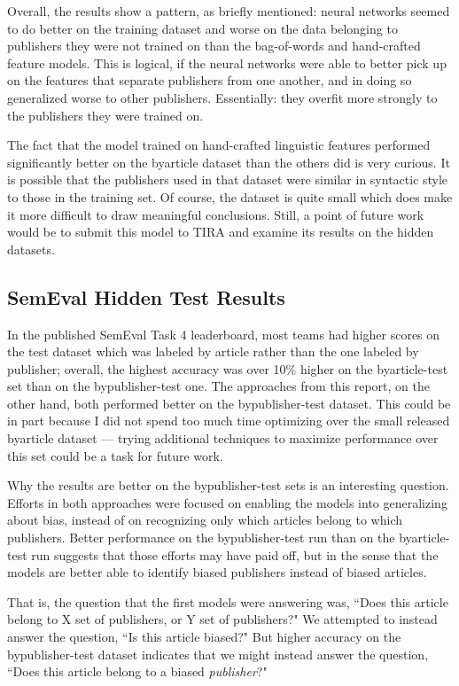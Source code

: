\documentclass[11pt, a4paper]{article}
\begin{document}
Overall, the results show a pattern, as briefly mentioned: neural networks seemed to do better on the training dataset and worse on the data belonging to publishers they were not trained on than the bag-of-words and hand-crafted feature models. This is logical, if the neural networks were able to better pick up on the features that separate publishers from one another, and in doing so generalized worse to other publishers. Essentially: they overfit more strongly to the publishers they were trained on.

The fact that the model trained on hand-crafted linguistic features performed significantly better on the byarticle dataset than the others did is very curious. It is possible that the publishers used in that dataset were similar in syntactic style to those in the training set. Of course, the dataset is quite small which does make it more difficult to draw meaningful conclusions. Still, a point of future work would be to submit this model to TIRA and examine its results on the hidden datasets.

\subsection{SemEval Hidden Test Results}

In the published SemEval Task 4 leaderboard, most teams had higher scores on the test dataset which was labeled by article rather than the one labeled by publisher; overall, the highest accuracy was over 10\% higher on the byarticle-test set than on the bypublisher-test one. The approaches from this report, on the other hand, both performed better on the bypublisher-test dataset. This could be in part because I did not spend too much time optimizing over the small released byarticle dataset --- trying additional techniques to maximize performance over this set could be a task for future work.

Why the results are better on the bypublisher-test sets is an interesting question. Efforts in both approaches were focused on enabling the models into generalizing about bias, instead of on recognizing only which articles belong to which publishers. Better performance on the bypublisher-test run than on the byarticle-test run suggests that those efforts may have paid off, but in the sense that the models are better able to identify biased publishers instead of biased articles. 

That is, the question that the first models were answering was, ``Does this article belong to X set of publishers, or Y set of publishers?" We attempted to instead answer the question, ``Is this article biased?" But higher accuracy on the bypublisher-test dataset indicates that we might instead answer the question, ``Does this article belong to a biased \textit{publisher}?"
\end{document}

